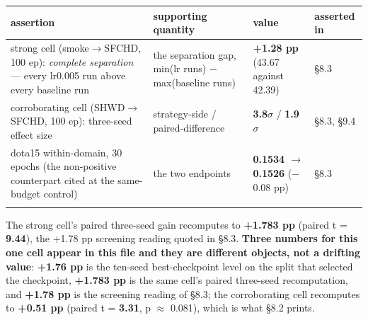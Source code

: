 \documentclass[pdflatex,sn-mathphys-ay]{sn-jnl}
\begin{document}
{\footnotesize
\setlength{\tabcolsep}{4pt}
\begin{longtable}{p{}p{}p{}p{}}
\toprule
assertion & supporting quantity & value & asserted in \\
\midrule
\endhead
strong cell (smoke\ensuremath{\rightarrow}SFCHD, 100 ep): \emph{complete separation} --- every lr0.005 run above every baseline run & the separation gap, min(lr runs) \ensuremath{-} max(baseline runs) & \textbf{+1.28 pp} (43.67 against 42.39) & \S{}8.3 \\
corroborating cell (SHWD\ensuremath{\rightarrow}SFCHD, 100 ep): three-seed effect size & strategy-side / paired-difference & \textbf{3.8\ensuremath{\sigma}} / \textbf{1.9\ensuremath{\sigma}} & \S{}8.3, \S{}9.4 \\
dota15 within-domain, 30 epochs (the non-positive counterpart cited at the same-budget control) & the two endpoints & \textbf{0.1534 \ensuremath{\rightarrow} 0.1526} (\ensuremath{-}0.08 pp) & \S{}8.3 \\
\botrule
\end{longtable}}

The strong cell's paired three-seed gain recomputes to \textbf{+1.783 pp} (paired t = \textbf{9.44}), the +1.78 pp screening reading quoted in \S{}8.3. \textbf{Three numbers for this one cell appear in this file and they are different objects, not a drifting value}: \textbf{+1.76 pp} is the ten-seed best-checkpoint level on the split that selected the checkpoint, \textbf{+1.783 pp} is the same cell's paired three-seed recomputation, and \textbf{+1.78 pp} is the screening reading of \S{}8.3; the corroborating cell recomputes to \textbf{+0.51 pp} (paired t = \textbf{3.31}, p \ensuremath{\approx} 0.081), which is what \S{}8.2 prints.
\end{document}
